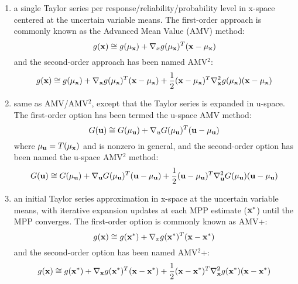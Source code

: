 \begin{enumerate}
\item a single Taylor series per response/reliability/probability level 
in x-space centered at the uncertain variable means.  The first-order 
approach is commonly known as the Advanced Mean Value (AMV) method:
\begin{equation}
g({\bf x}) \cong g(\mu_{\bf x}) + \nabla_x g(\mu_{\bf x})^T 
({\bf x} - \mu_{\bf x}) \label{eq:linear_x_mean}
\end{equation}
and the second-order approach has been named AMV$^2$:
\begin{equation}
g({\bf x}) \cong g(\mu_{\bf x}) + \nabla_{\bf x} g(\mu_{\bf x})^T 
({\bf x} - \mu_{\bf x}) + \frac{1}{2} ({\bf x} - \mu_{\bf x})^T 
\nabla^2_{\bf x} g(\mu_{\bf x}) ({\bf x} - \mu_{\bf x})
\label{eq:taylor2_x_mean}
\end{equation}

\item same as AMV/AMV$^2$, except that the Taylor series is expanded 
in u-space.  The first-order option has been termed the u-space AMV 
method:
\begin{equation}
G({\bf u}) \cong G(\mu_{\bf u}) + \nabla_u G(\mu_{\bf u})^T 
({\bf u} - \mu_{\bf u}) \label{eq:linear_u_mean}
\end{equation}
where $\mu_{\bf u} = T(\mu_{\bf x})$ and is nonzero in general, and 
the second-order option has been named the u-space AMV$^2$ method:
\begin{equation}
G({\bf u}) \cong G(\mu_{\bf u}) + \nabla_{\bf u} G(\mu_{\bf u})^T 
({\bf u} - \mu_{\bf u}) + \frac{1}{2} ({\bf u} - \mu_{\bf u})^T 
\nabla^2_{\bf u} G(\mu_{\bf u}) ({\bf u} - \mu_{\bf u}) 
\label{eq:taylor2_u_mean}
\end{equation}

\item an initial Taylor series approximation in x-space at the uncertain 
variable means, with iterative expansion updates at each MPP estimate
(${\bf x}^*$) until the MPP converges.  The first-order option is
commonly known as AMV+:
\begin{equation}
g({\bf x}) \cong g({\bf x}^*) + \nabla_x g({\bf x}^*)^T ({\bf x} - {\bf x}^*)
\label{eq:linear_x_mpp}
\end{equation}
and the second-order option has been named AMV$^2$+:
\begin{equation}
g({\bf x}) \cong g({\bf x}^*) + \nabla_{\bf x} g({\bf x}^*)^T 
({\bf x} - {\bf x}^*) + \frac{1}{2} ({\bf x} - {\bf x}^*)^T 
\nabla^2_{\bf x} g({\bf x}^*) ({\bf x} - {\bf x}^*) \label{eq:taylor2_x_mpp}
\end{equation}


\end{enumerate}
